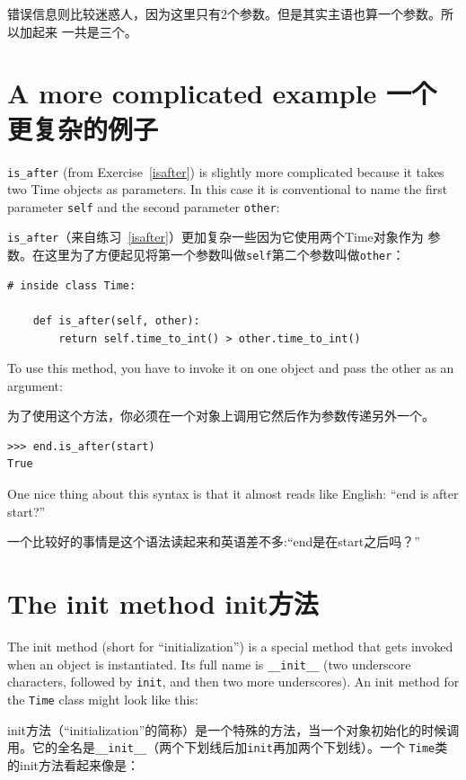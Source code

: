 \documentclass[10pt]{book}
\begin{document}
\begin{CJK}{UTF8}{gbsn}
错误信息则比较迷惑人，因为这里只有2个参数。但是其实主语也算一个参数。所以加起来
一共是三个。

\section{A more complicated example 一个更复杂的例子}

\verb"is_after" (from Exercise~\ref{isafter}) is slightly more complicated
because it takes two Time objects as parameters.  In this case it is
conventional to name the first parameter {\tt self} and the second
parameter {\tt other}:

\verb"is_after"（来自练习~\ref{isafter}）更加复杂一些因为它使用两个Time对象作为
参数。在这里为了方便起见将第一个参数叫做{\tt self}第二个参数叫做{\tt other}：

\begin{verbatim}
# inside class Time:

    def is_after(self, other):
        return self.time_to_int() > other.time_to_int()
\end{verbatim}
%
To use this method, you have to invoke it on one object and pass
the other as an argument:

为了使用这个方法，你必须在一个对象上调用它然后作为参数传递另外一个。

\begin{verbatim}
>>> end.is_after(start)
True
\end{verbatim}
%
One nice thing about this syntax is that it almost reads
like English: ``end is after start?''

一个比较好的事情是这个语法读起来和英语差不多:``end是在start之后吗？''


\section{The init method init方法}

The init method (short for ``initialization'') is
a special method that gets invoked when an object is instantiated.  
Its full name is \verb"__init__" (two underscore characters,
followed by {\tt init}, and then two more underscores).  An
init method for the {\tt Time} class might look like this:

init方法（``initialization''的简称）是一个特殊的方法，当一个对象初始化的时候调
用。它的全名是\verb"__init__"（两个下划线后加{\tt init}再加两个下划线）。一个
{\tt Time}类的init方法看起来像是：


\end{CJK}
\end{document}
